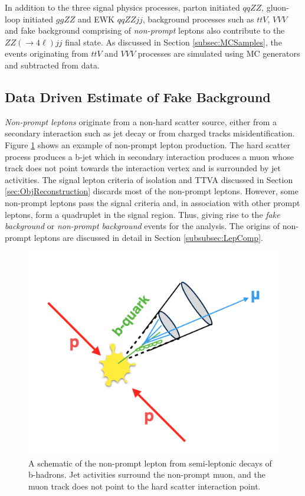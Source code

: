 In addition to the three signal physics processes, parton initiated $qqZZ$, gluon-loop initiated $ggZZ$ and EWK $qqZZjj$, background processes such as $ttV$, $VVV$ and fake background comprising of \textit{non-prompt} leptons also contribute to the $ZZ(\rightarrow 4\ell) jj$ final state. As discussed in Section \ref{subsec:MCSamples}, the events originating from $ttV$ and $VVV$ processes are simulated using MC generators and subtracted from data.

\subsection{Data Driven Estimate of Fake Background}
\label{subsec:FakeBackground}

\textit{Non-prompt leptons} originate from a non-hard scatter source, either from a secondary interaction such as jet decay or from charged tracks misidentification. Figure \ref{fig:NonPromptLepton} shows an example of non-prompt lepton production. The hard scatter process produces a b-jet which in secondary interaction produces a muon whose track does not point towards the interaction vertex and is surrounded by jet activities. The signal lepton criteria of isolation and TTVA discussed in Section \ref{sec:ObjReconstruction} discards most of the non-prompt leptons. However, some non-prompt leptons pass the signal criteria and, in association with other prompt leptons, form a quadruplet in the signal region. Thus, giving rise to the \textit{fake background} or \textit{non-prompt background} events for the analysis. The origins of non-prompt leptons are discussed in detail in Section \ref{subsubsec:LepComp}.

\begin{figure}
    \centering
    \includegraphics[width=.7\linewidth]{figures/Analysis/Background/NonPromptLeptonExample.png}  
    \caption{A schematic of the non-prompt lepton from semi-leptonic decays of b-hadrons. Jet activities surround the non-prompt muon, and the muon track does not point to the hard scatter interaction point.\label{fig:NonPromptLepton}}
\end{figure}

